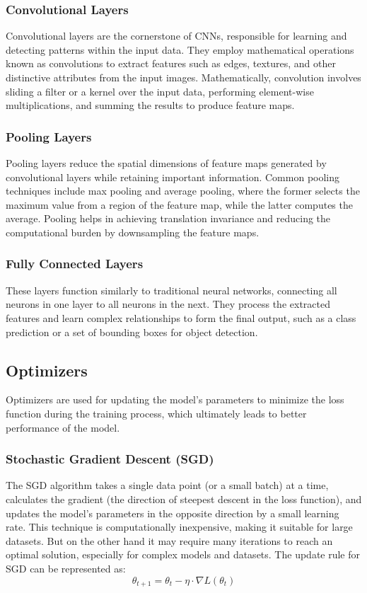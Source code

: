 \documentclass{article}
\begin{document}
\subsubsection{Convolutional Layers}
Convolutional layers are the cornerstone of CNNs, responsible for learning and detecting patterns within the input data. They employ mathematical operations known as convolutions to extract features such as edges, textures, and other distinctive attributes from the input images. Mathematically, convolution involves sliding a filter or a kernel over the input data, performing element-wise multiplications, and summing the results to produce feature maps.

\subsubsection{Pooling Layers}
Pooling layers reduce the spatial dimensions of feature maps generated by convolutional layers while retaining important information. Common pooling techniques include max pooling and average pooling, where the former selects the maximum value from a region of the feature map, while the latter computes the average. Pooling helps in achieving translation invariance and reducing the computational burden by downsampling the feature maps.

\subsubsection{Fully Connected Layers}
These layers function similarly to traditional neural networks, connecting all neurons in one layer to all neurons in the next. They process the extracted features and learn complex relationships to form the final output, such as a class prediction or a set of bounding boxes for object detection.

\subsection{Optimizers}
Optimizers are used for updating the model's parameters to minimize the loss function during the training process, which ultimately leads to better performance of the model.

\subsubsection{Stochastic Gradient Descent (SGD)}
The SGD algorithm takes a single data point (or a small batch) at a time, calculates the gradient (the direction of steepest descent in the loss function), and updates the model's parameters in the opposite direction by a small learning rate. This technique is computationally inexpensive, making it suitable for large datasets. But on the other hand it may require many iterations to reach an optimal solution, especially for complex models and datasets. The update rule for SGD can be represented as:
$${\theta_{t+1} = \theta_t - \eta \cdot \nabla L(\theta_t)}$$
\end{document}
